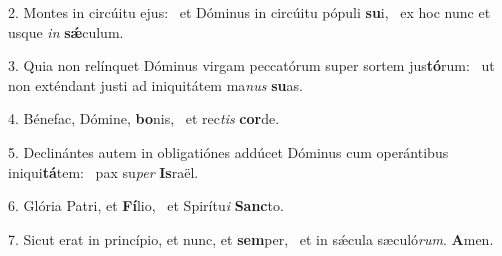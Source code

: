 2. Montes in circúitu ejus: \dag\  et Dóminus in circúitu pópuli \textbf{su}i, \ast\  ex hoc nunc et usque \textit{in} \textbf{sǽ}culum.\

3. Quia non relínquet Dóminus virgam peccatórum super sortem jus\textbf{tó}rum: \ast\  ut non exténdant justi ad iniquitátem ma\textit{nus} \textbf{su}as.\

4. Bénefac, Dómine, \textbf{bo}nis, \ast\  et rec\textit{tis} \textbf{cor}de.\

5. Declinántes autem in obligatiónes addúcet Dóminus cum operántibus iniqui\textbf{tá}tem: \ast\  pax su\textit{per} \textbf{Is}raël.\

6. Glória Patri, et \textbf{Fí}lio, \ast\  et Spirítu\textit{i} \textbf{Sanc}to.\

7. Sicut erat in princípio, et nunc, et \textbf{sem}per, \ast\  et in sǽcula sæculó\textit{rum}. \textbf{A}men.\

